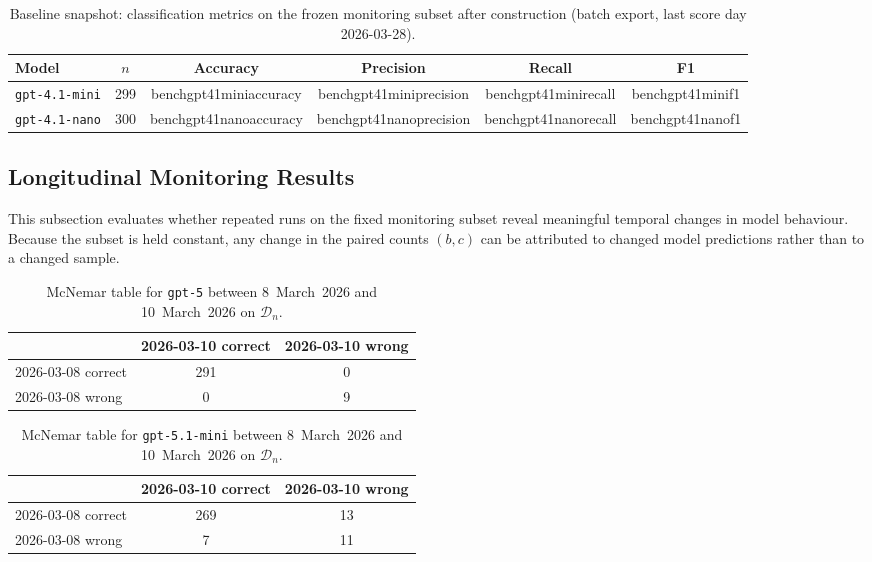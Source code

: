 \begin{table}[htbp]
    \centering
    \caption{Baseline snapshot: classification metrics on the frozen monitoring subset after construction (batch export, last score day 2026-03-28).}
    \label{tab:phase1-baseline-snapshot}
    \begin{tabular}{lccccc}
        \toprule
        Model & $n$ & Accuracy & Precision & Recall & F1 \\
        \midrule
        \texttt{gpt-4.1-mini} & 299 & {\csname benchgpt41miniaccuracy\endcsname} & {\csname benchgpt41miniprecision\endcsname} & {\csname benchgpt41minirecall\endcsname} & {\csname benchgpt41minif1\endcsname} \\
        \texttt{gpt-4.1-nano}  & 300 & {\csname benchgpt41nanoaccuracy\endcsname} & {\csname benchgpt41nanoprecision\endcsname} & {\csname benchgpt41nanorecall\endcsname} & {\csname benchgpt41nanof1\endcsname} \\
        \bottomrule
    \end{tabular}
\end{table}

\subsection{Longitudinal Monitoring Results}
\label{sec:drift-results}

This subsection evaluates whether repeated runs on the fixed monitoring subset reveal meaningful temporal changes in model behaviour. Because the subset is held constant, any change in the paired counts \((b,c)\) can be attributed to changed model predictions rather than to a changed sample.

\begin{table}[htbp]
    \centering
    \caption{McNemar table for \texttt{gpt-5} between 8~March~2026 and 10~March~2026 on $\mathcal{D}_n$.}
    \label{tab:mcnemar_gpt5}
    \begin{tabular}{lcc}
        \toprule
        & 2026-03-10 correct & 2026-03-10 wrong \\
        \midrule
        2026-03-08 correct & 291 & 0 \\
        2026-03-08 wrong   & 0   & 9 \\
        \bottomrule
    \end{tabular}
\end{table}

\begin{table}[htbp]
    \centering
    \caption{McNemar table for \texttt{gpt-5.1-mini} between 8~March~2026 and 10~March~2026 on $\mathcal{D}_n$.}
    \label{tab:mcnemar_gpt5mini}
    \begin{tabular}{lcc}
        \toprule
        & 2026-03-10 correct & 2026-03-10 wrong \\
        \midrule
        2026-03-08 correct & 269 & 13 \\
        2026-03-08 wrong   & 7   & 11 \\
        \bottomrule
    \end{tabular}
\end{table}

